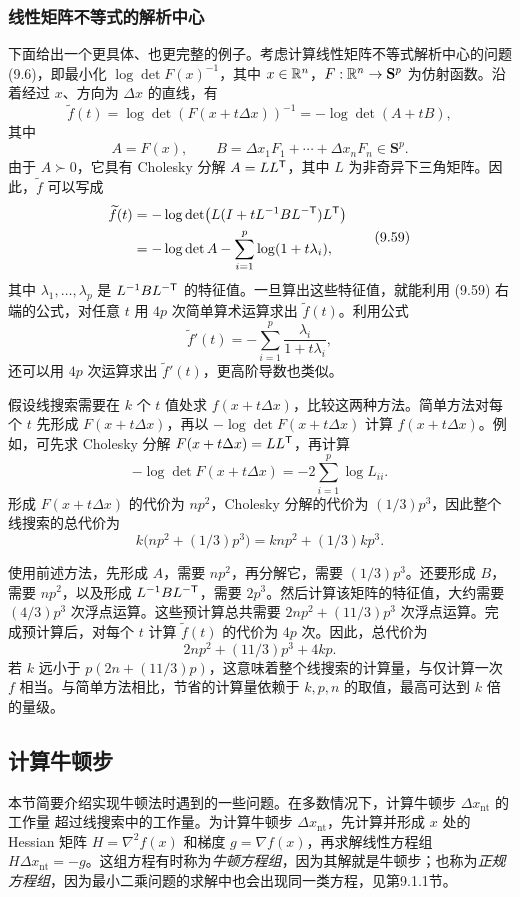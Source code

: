 \subsubsection*{线性矩阵不等式的解析中心}
下面给出一个更具体、也更完整的例子。考虑计算线性矩阵不等式解析中心的问题 (9.6)，即最小化 $\log\det F(x)^{-1}$，其中 $x\in\mathbb R^n$，$F:\mathbb R^n\to\mathbf S^p$ 为仿射函数。沿着经过 $x$、方向为 $\Delta x$ 的直线，有
\[
 \widetilde f(t)=\log\det(F(x+t\Delta x))^{-1}=-\log\det(A+tB),
\]
其中
\[
 A=F(x),\qquad B=\Delta x_1F_1+\cdots+\Delta x_nF_n\in\mathbf S^p.
\]
由于 $A\succ0$，它具有 Cholesky 分解 $A=LL^\mathsf T$，其中 $L$ 为非奇异下三角矩阵。因此，$\widetilde f$ 可以写成
\begin{equation}
\begin{aligned}
 \widetilde f(t)&=-\log\det\bigl(L(I+tL^{-1}BL^{-\mathsf T})L^\mathsf T\bigr)\\
 &=-\log\det A-\sum_{i=1}^p\log(1+t\lambda_i),
\end{aligned}\tag{9.59}
\end{equation}
其中 $\lambda_1,\ldots,\lambda_p$ 是 $L^{-1}BL^{-\mathsf T}$ 的特征值。一旦算出这些特征值，就能利用 (9.59) 右端的公式，对任意 $t$ 用 $4p$ 次简单算术运算求出 $\widetilde f(t)$。利用公式
\[
 \widetilde f'(t)=-\sum_{i=1}^p\frac{\lambda_i}{1+t\lambda_i},
\]
还可以用 $4p$ 次运算求出 $\widetilde f'(t)$，更高阶导数也类似。

假设线搜索需要在 $k$ 个 $t$ 值处求 $f(x+t\Delta x)$，比较这两种方法。简单方法对每个 $t$ 先形成 $F(x+t\Delta x)$，再以 $-\log\det F(x+t\Delta x)$ 计算 $f(x+t\Delta x)$。例如，可先求 Cholesky 分解 $F(x+t\Delta x)=LL^\mathsf T$，再计算
\[
 -\log\det F(x+t\Delta x)=-2\sum_{i=1}^p\log L_{ii}.
\]
形成 $F(x+t\Delta x)$ 的代价为 $np^2$，Cholesky 分解的代价为 $(1/3)p^3$，因此整个线搜索的总代价为
\[
 k\bigl(np^2+(1/3)p^3\bigr)=knp^2+(1/3)kp^3.
\]

使用前述方法，先形成 $A$，需要 $np^2$，再分解它，需要 $(1/3)p^3$。还要形成 $B$，需要 $np^2$，以及形成 $L^{-1}BL^{-\mathsf T}$，需要 $2p^3$。然后计算该矩阵的特征值，大约需要 $(4/3)p^3$ 次浮点运算。这些预计算总共需要 $2np^2+(11/3)p^3$ 次浮点运算。完成预计算后，对每个 $t$ 计算 $\widetilde f(t)$ 的代价为 $4p$ 次。因此，总代价为
\[
 2np^2+(11/3)p^3+4kp.
\]
若 $k$ 远小于 $p(2n+(11/3)p)$，这意味着整个线搜索的计算量，与仅计算一次 $f$ 相当。与简单方法相比，节省的计算量依赖于 $k,p,n$ 的取值，最高可达到 $k$ 倍的量级。

\subsection{计算牛顿步}
本节简要介绍实现牛顿法时遇到的一些问题。在多数情况下，计算牛顿步 $\Delta x_{\mathrm{nt}}$ 的工作量
超过线搜索中的工作量。为计算牛顿步 $\Delta x_{\mathrm{nt}}$，先计算并形成 $x$ 处的 Hessian 矩阵 $H=\nabla^2f(x)$ 和梯度 $g=\nabla f(x)$，再求解线性方程组 $H\Delta x_{\mathrm{nt}}=-g$。这组方程有时称为\emph{牛顿方程组}，因为其解就是牛顿步；也称为\emph{正规方程组}，因为最小二乘问题的求解中也会出现同一类方程，见第9.1.1节。

